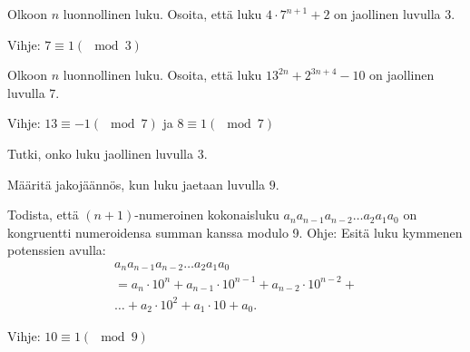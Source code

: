 \begin{tehtavasivu}
\begin{tehtava}
  Olkoon $n$ luonnollinen luku. Osoita, että luku $4\cdot 7^{n+1}+2$ on jaollinen luvulla $3$.
  \begin{vastaus}
      Vihje: $7 \equiv 1 (\mod{3})$
  \end{vastaus}
\end{tehtava}

\begin{tehtava}
  Olkoon $n$ luonnollinen luku. Osoita, että luku $13^{2n} + 2^{3n+4} - 10$ on jaollinen luvulla $7$.
  \begin{vastaus}
  Vihje: $13 \equiv -1 (\mod{7})$ ja $8 \equiv 1 (\mod{7})$
  \end{vastaus}
\end{tehtava}

\begin{tehtava}
  Tutki, onko luku jaollinen luvulla $3$.
  \begin{alakohdat}
  \end{alakohdat}
  \begin{vastaus}
  \begin{alakohdat}
  \end{alakohdat}
  \end{vastaus}
\end{tehtava}

\begin{tehtava}
  Määritä jakojäännös, kun luku jaetaan luvulla $9$.
  \begin{alakohdat}
  \end{alakohdat}
  \begin{vastaus}
  \begin{alakohdat}
  \end{alakohdat}
  \end{vastaus}  
\end{tehtava}

\begin{tehtava}
  Todista, että $(n+1)$-numeroinen kokonaisluku $a_na_{n-1}a_{n-2}\ldots a_2a_1a_0$ on kongruentti numeroidensa summan kanssa modulo 9. Ohje: Esitä luku kymmenen potenssien avulla:
  \begin{multline*}
  a_na_{n-1}a_{n-2}\ldots a_2a_1a_0\\ = a_n \cdot 10^n + a_{n-1}\cdot 10^{n-1} + a_{n-2} \cdot 10^{n-2} + \\
  \ldots + a_2 \cdot 10^2 + a_1 \cdot 10 + a_0.
  \end{multline*}
  \begin{vastaus}
  Vihje: $10 \equiv 1 (\mod{9})$
  \end{vastaus}  
\end{tehtava}


\end{tehtavasivu}
